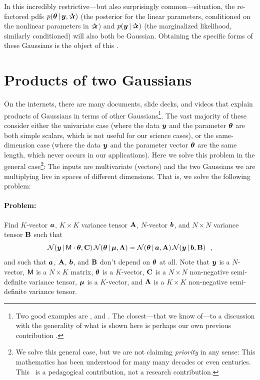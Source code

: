 In this incredibly restrictive---but also surprisingly
common---situation, the re-factored pdfs $p(\vtheta\given\vy,\bP)$
(the posterior for the linear parameters, conditioned on
the nonlinear parameters in $\bP$) and $p(\vy\given\bP)$ (the
marginalized likelihood, similarly conditioned) will also both be Gaussian.
Obtaining the specific forms of these Gaussians is the object of this
\documentname.

\section{Products of two Gaussians}\label{sec:problemsolution}

On the internets, there are many documents, slide decks, and videos
that explain products of Gaussians in terms of other Gaussians\footnote{Two
  good examples are \cite{roweis}, and \cite{cookbook}. The closest---that we know
  of---to a
  discussion with the generality of
  what is shown here is perhaps our own previous contribution \cite{luger}.}.
The vast majority of these consider either the univariate case (where
the data $\boldsymbol{y}$ and the parameter $\boldsymbol{\theta}$ are both simple scalars, which
is not useful for our science cases), or the same-dimension case (where the data
$\boldsymbol{y}$ and the parameter vector $\boldsymbol{\theta}$ are the same length, which never
occurs in our applications).
Here we solve this problem in the general case\footnote{We solve this general
  case, but we are not claiming \emph{priority} in any sense: This mathematics
  has been understood for many many decades or even centuries. This \documentname\ is
  a pedagogical contribution, not a research contribution.}:
The inputs are multivariate (vectors) and the two Gaussians we are
multiplying live in spaces of different dimensions.
That is, we solve the following problem:

\paragraph{Problem:}
Find $K$-vector $\boldsymbol{a}$, $K\times K$ variance tensor $\mathbf{A}$, $N$-vector $\boldsymbol{b}$,
and $N\times N$ variance tensor $\mathbf{B}$ such that
\begin{equation}\label{eq:problem}
\mathcal{N}\!\,(\boldsymbol{y}\,|\,\mathsf{M}\cdot\boldsymbol{\theta},\mathbf{C})\,\mathcal{N}\!\,(\boldsymbol{\theta}\,|\,\boldsymbol{\mu},\mathbf{\Lambda})
 = \mathcal{N}\!\,(\boldsymbol{\theta}\,|\,\boldsymbol{a},\mathbf{A})\,\mathcal{N}\!\,(\boldsymbol{y}\,|\,\boldsymbol{b},\mathbf{B}) ~~,
\end{equation}
and such that $\boldsymbol{a}$, $\mathbf{A}$, $\boldsymbol{b}$, and $\mathbf{B}$ don't depend on $\boldsymbol{\theta}$ at all.
Note that
$\boldsymbol{y}$ is a $N$-vector,
$\mathsf{M}$ is a $N\times K$ matrix,
$\boldsymbol{\theta}$ is a $K$-vector,
$\mathbf{C}$ is a $N\times N$ non-negative semi-definite variance tensor,
$\boldsymbol{\mu}$ is a $K$-vector,
and
$\mathbf{\Lambda}$ is a $K\times K$ non-negative semi-definite variance tensor.

